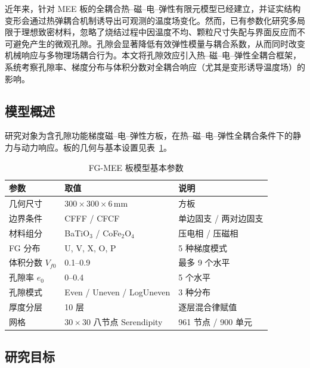 \documentclass[11pt,a4paper]{ctexart}
\begin{document}
近年来，针对 MEE 板的全耦合热--磁--电--弹性有限元模型已经建立，并证实结构变形会通过热弹耦合机制诱导出可观测的温度场变化。然而，已有参数化研究多局限于理想致密材料，忽略了烧结过程中因温度不均、颗粒尺寸失配与界面反应而不可避免产生的微观孔隙。孔隙会显著降低有效弹性模量与耦合系数，从而同时改变机械响应与多物理场耦合行为。本文将孔隙效应引入热--磁--电--弹性全耦合框架，系统考察孔隙率、梯度分布与体积分数对全耦合响应（尤其是变形诱导温度场）的影响。

\subsection{模型概述}

研究对象为含孔隙功能梯度磁--电--弹性方板，在热--磁--电--弹性全耦合条件下的静力与动力响应。板的几何与基本设置见表~\ref{tab:model-params}。

\begin{table}[H]
\centering
\caption{FG-MEE 板模型基本参数}
\label{tab:model-params}
\begin{tabular}{lll}
\toprule
\textbf{参数} & \textbf{取值} & \textbf{说明} \\
\midrule
几何尺寸 & $300\times300\times6$\,mm & 方板 \\
边界条件 & CFFF / CFCF & 单边固支 / 两对边固支 \\
材料组分 & BaTiO$_3$ / CoFe$_2$O$_4$ & 压电相 / 压磁相 \\
FG 分布 & U, V, X, O, P & 5 种梯度模式 \\
体积分数 $V_{f0}$ & 0.1--0.9 & 最多 9 个水平 \\
孔隙率 $e_0$ & 0--0.4 & 5 个水平 \\
孔隙模式 & Even / Uneven / LogUneven & 3 种分布 \\
厚度分层 & 10 层 & 逐层混合律赋值 \\
网格 & $30\times30$ 八节点 Serendipity & 961 节点 / 900 单元 \\
\bottomrule
\end{tabular}
\end{table}

\subsection{研究目标}
\end{document}
